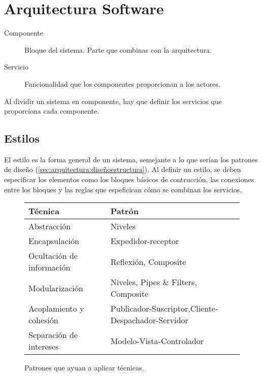 \section{Arquitectura Software}
\label{sec:arquitectura:arquitectura}


\begin{description}
\item[Componente] Bloque del sistema. Parte que combinas con la arquitectura.
\item[Servicio] Funcionalidad que los componentes proporcionan a los actores.
\end{description}

Al dividir un sistema en componente, hay que definir los servicios que
proporciona cada componente.

\subsection{Estilos}
\label{sec:estilos}

El estilo es la forma general de un sistema, semejante a lo que serían
los patrones de diseño (\ref{sec:arquitectura:diseñoestructura}). Al
definir un estilo, se deben especificar los elementos como los bloques
básicos de contrucción, las conexiones entre los bloques y las reglas
que espeficican cómo se combinan los servicios.

\begin{figure}[h]
  \centering
  \begin{tabular}{l | l}
    \textbf{Técnica} & \textbf{Patrón}\\\hline
    Abstracción & Niveles \\
    Encapsulación & Expedidor-receptor \\
    Ocultación de información & Reflexión, Composite \\
    Modularización & Niveles, Pipes \& Filters, Composite\\
    Acoplamiento y
    cohesión & Publicador-Suscriptor,Cliente-Despachador-Servidor\\
    Separación de intereses & Modelo-Vista-Controlador
  \end{tabular}
  \caption{Patrones que ayuan a aplicar técnicas.}
  \label{fig:patronesestilo}
\end{figure}


